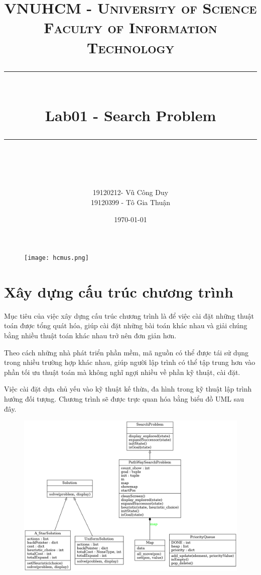 \documentclass[11pt]{scrartcl} %
\title{	
	\normalfont\normalsize
	\textsc{VNUHCM - University of Science \\Faculty of Information Technology}\\ %
	\vspace{25pt} %
	\rule{\linewidth}{0.5pt}\\ %
	\vspace{20pt} %
	{\huge Lab01 - Search Problem}\\ %
	\vspace{12pt} %
	\rule{\linewidth}{2pt}\\ %
	\vspace{12pt} %
}
\author{\LARGE 19120212- Vũ Công Duy \\ \LARGE 19120399 - Tô Gia Thuận}
\date{\normalsize\today} %
\begin{document}
\maketitle 
\begin{figure}[h] %
	\centering
	\texttt{[image: hcmus.png]} %
\end{figure}

\section{Xây dựng cấu trúc chương trình} \cite{standfordcs221}
Mục tiêu của việc xây dựng cấu trúc chương trình là để việc cài đặt những thuật toán được tổng quát hóa, giúp cài đặt những bài toán khác nhau và giải chúng bằng nhiều thuật toán khác nhau trở nên đơn giản hơn. 

Theo cách những nhà phát triển phần mềm, mã nguồn có thể được tái sử dụng trong nhiều trường hợp khác nhau, giúp người lập trình có thể tập trung hơn vào phần tối ưu thuật toán mà không nghĩ ngợi nhiều về phần kỹ thuật, cài đặt.

Việc cài đặt dựa chủ yếu vào kỹ thuật kế thừa, đa hình trong kỹ thuật lập trình hướng đối tượng. Chương trình sẽ được trực quan hóa bằng biểu đồ UML sau đây.
\begin{figure}[h] %
	\centering
	\includegraphics[width=1.2\columnwidth]{classes_uml_diagram.png} %
\end{figure}
\end{document}
